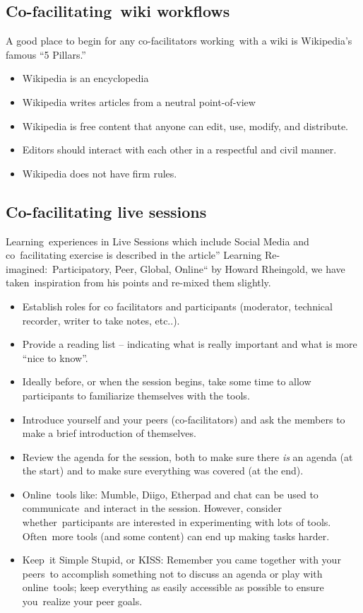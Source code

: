 \subsection{Co-facilitating~wiki workflows}

A good place to begin for any co-facilitators working~with a wiki is
Wikipedia's famous ``5 Pillars.''

\begin{itemize}
\item
  Wikipedia is an encyclopedia
\item
  Wikipedia writes articles from a neutral point-of-view
\item
  Wikipedia is free content that anyone can edit, use, modify, and
  distribute.
\item
  Editors should interact with each other in a respectful and civil
  manner.
\item
  Wikipedia does not have firm rules.
\end{itemize}

\subsection{Co-facilitating live sessions}

Learning~experiences in Live Sessions which include Social Media and
co~facilitating exercise is described in the article'' Learning
Re-imagined:~Participatory, Peer, Global, Online`` by Howard Rheingold,
we have taken~inspiration from his points and re-mixed them slightly.

\begin{itemize}
\item
  Establish roles for co facilitators and participants (moderator,
  technical recorder, writer to take notes, etc..).
\item
  Provide a reading list -- indicating what is really important and what
  is more ``nice to know''.
\item
  Ideally before, or when the session begins, take some time to allow
  participants to familiarize themselves with the tools.
\item
  Introduce yourself and your peers (co-facilitators) and ask the
  members to make a brief introduction of themselves.
\item
  Review the agenda for the session, both to make sure there \emph{is}
  an agenda (at the start) and to make sure everything was covered (at
  the end).
\item
  Online~tools like: Mumble, Diigo, Etherpad and chat can be used to
  communicate~and interact in the session. However, consider
  whether~participants are interested in experimenting with lots of
  tools. Often~more tools (and some content) can end up making tasks
  harder.
\item
  Keep~it Simple Stupid, or KISS: Remember you came together with your
  peers~to accomplish something not to discuss an agenda or play with
  online~tools; keep everything as easily accessible as possible to
  ensure you~realize your peer goals.
\end{itemize}


